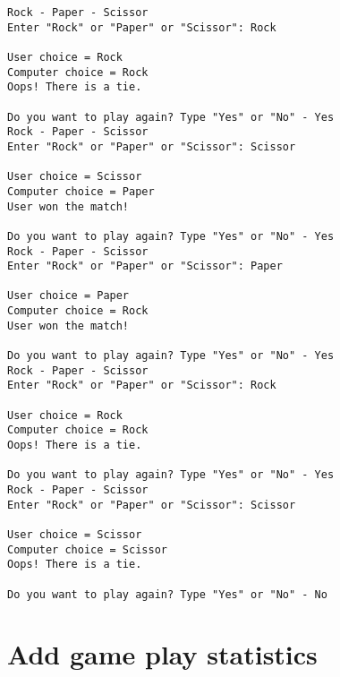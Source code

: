 \documentclass[11pt]{article}
\begin{document}
    \begin{Verbatim}[commandchars=\\\{\}]
Rock - Paper - Scissor
Enter "Rock" or "Paper" or "Scissor": Rock

User choice = Rock
Computer choice = Rock
Oops! There is a tie.

Do you want to play again? Type "Yes" or "No" - Yes
Rock - Paper - Scissor
Enter "Rock" or "Paper" or "Scissor": Scissor

User choice = Scissor
Computer choice = Paper
User won the match!

Do you want to play again? Type "Yes" or "No" - Yes
Rock - Paper - Scissor
Enter "Rock" or "Paper" or "Scissor": Paper

User choice = Paper
Computer choice = Rock
User won the match!

Do you want to play again? Type "Yes" or "No" - Yes
Rock - Paper - Scissor
Enter "Rock" or "Paper" or "Scissor": Rock

User choice = Rock
Computer choice = Rock
Oops! There is a tie.

Do you want to play again? Type "Yes" or "No" - Yes
Rock - Paper - Scissor
Enter "Rock" or "Paper" or "Scissor": Scissor

User choice = Scissor
Computer choice = Scissor
Oops! There is a tie.

Do you want to play again? Type "Yes" or "No" - No
    \end{Verbatim}

    \hypertarget{add-game-play-statistics}{%
\section{Add game play statistics}\label{add-game-play-statistics}}
\end{document}

